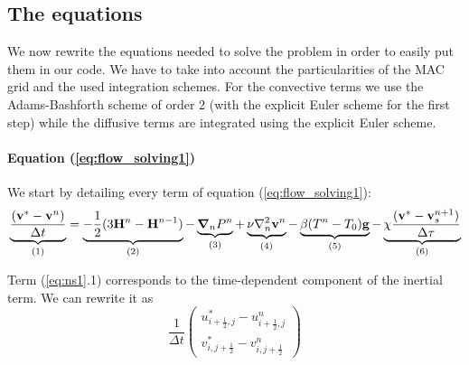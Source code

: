 \documentclass[a4paper,10pt]{scrartcl}
\begin{document}
\subsection{The equations}
We now rewrite the equations needed to solve the problem in order to easily put them in our code. We have to take into account the particularities of the MAC grid and the used integration schemes. For the convective terms we use the Adams-Bashforth scheme of order 2 (with the explicit Euler scheme for the first step) while the diffusive terms are integrated using the explicit Euler scheme.
\paragraph{Equation (\ref{eq:flow_solving1})}
We start by detailing every term of equation (\ref{eq:flow_solving1}):
\begin{equation} \underbrace{\frac{(\vb{v}^*-\vb{v}^n)}{\Delta t}}_{(1)} = \underbrace{-\frac{1}{2}(3\vb{H}^n-\vb{H}^{n-1})}_{(2)} - \underbrace{\grad_nP^n}_{(3)} + \underbrace{\nu\laplacian_n\vb{v}^n}_{(4)} - \underbrace{\beta(T^n-T_0)\vb{g}}_{(5)} - \underbrace{\chi\frac{(\vb{v}^*-\vb{v}_s^{n+1})}{\Delta\tau}}_{(6)} \label{eq:ns1}\end{equation}

Term (\ref{eq:ns1}.1) corresponds to the time-dependent component of the inertial term. We can rewrite it as
\begin{equation} \frac{1}{\Delta t}\begin{pmatrix} u^*_{i+\frac{1}{2},j} - u^n_{i+\frac{1}{2},j} \\ v^*_{i,j+\frac{1}{2}} - v^n_{i,j+\frac{1}{2}} \end{pmatrix} \end{equation}
\end{document}
